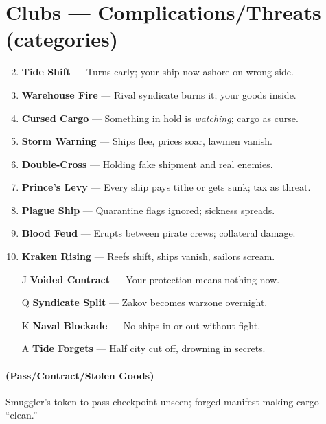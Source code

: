 \section*{Clubs --- Complications/Threats (categories)}
\label{sec:zakov-complications}
\begin{enumerate}
\setcounter{enumi}{1}
\item \textbf{Tide Shift} --- Turns early; your ship now ashore on wrong side.
\item \textbf{Warehouse Fire} --- Rival syndicate burns it; your goods inside.
\item \textbf{Cursed Cargo} --- Something in hold is \textit{watching}; cargo as curse.
\item \textbf{Storm Warning} --- Ships flee, prices soar, lawmen vanish.
\item \textbf{Double-Cross} --- Holding fake shipment and real enemies.
\item \textbf{Prince's Levy} --- Every ship pays tithe or gets sunk; tax as threat.
\item \textbf{Plague Ship} --- Quarantine flags ignored; sickness spreads.
\item \textbf{Blood Feud} --- Erupts between pirate crews; collateral damage.
\item \textbf{Kraken Rising} --- Reefs shift, ships vanish, sailors scream.
\item[J] \textbf{Voided Contract} --- Your protection means nothing now.
\item[Q] \textbf{Syndicate Split} --- Zakov becomes warzone overnight.
\item[K] \textbf{Naval Blockade} --- No ships in or out without fight.
\item[A] \textbf{Tide Forgets} --- Half city cut off, drowning in secrets.
\end{enumerate}

\paragraph*{(Pass/Contract/Stolen Goods)} Smuggler's token to pass checkpoint unseen; forged manifest making cargo ``clean.''

